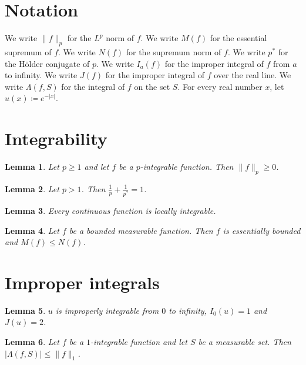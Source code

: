 \documentclass{article}
\newtheorem{lemma}{Lemma}
\begin{document}
\section{Notation}

We write $\|f\|_p$ for the $L^p$ norm of $f$.
We write $M(f)$ for the essential supremum of $f$.
We write $N(f)$ for the supremum norm of $f$.
We write $p^*$ for the Hölder conjugate of $p$.
We write $I_a(f)$ for the improper integral of $f$ from $a$ to infinity.
We write $J(f)$ for the improper integral of $f$ over the real line.
We write $\Lambda(f,S)$ for the integral of $f$ on the set $S$.
For every real number $x$, let $u(x)\coloneqq e^{-|x|}$.

\section{Integrability}

\begin{lemma}\label{lp}
Let $p\ge1$ and let $f$ be a $p$-integrable function. Then $\|f\|_p\ge0$.
\end{lemma}

\begin{lemma}\label{conjugate}
Let $p>1$. Then $\frac{1}{p}+\frac{1}{p^*}=1$.
\end{lemma}

\begin{lemma}\label{local}
Every continuous function is locally integrable.
\end{lemma}

\begin{lemma}\label{bounded}
Let $f$ be a bounded measurable function. Then $f$ is essentially bounded and $M(f)\le N(f)$.
\end{lemma}

\section{Improper integrals}

\begin{lemma}\label{exp}
$u$ is improperly integrable from $0$ to infinity, $I_0(u)=1$ and $J(u)=2$.
\end{lemma}

\begin{lemma}\label{set}
Let $f$ be a $1$-integrable function and let $S$ be a measurable set. Then $|\Lambda(f,S)|\le\|f\|_1$.
\end{lemma}
\end{document}
